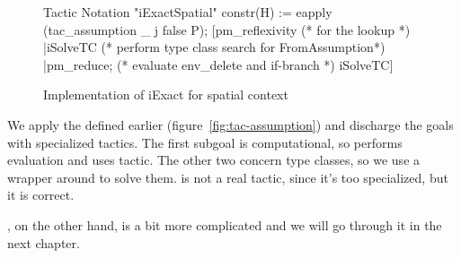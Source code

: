 \begin{figure}[H]
\begin{coq}
Tactic Notation "iExactSpatial" constr(H) :=
  eapply (tac_assumption _ j false P);
    [pm_reflexivity (* for the lookup *)
    |iSolveTC (* perform type class search for FromAssumption*)
    |pm_reduce; (* evaluate env_delete and if-branch *)
     iSolveTC]
\end{coq}
\caption{Implementation of iExact for spatial context}
\label{fig:ltac1-iassumption}
\end{figure}

We apply the  defined earlier (figure~\ref{fig:tac-assumption}) and discharge the goals with specialized tactics.
The first subgoal  is computational, so  performs evaluation and uses  tactic.
The other two concern type classes, so we use a wrapper around  to solve them.
 is not a real tactic, since it's too specialized, but it is correct.

, on the other hand, is a bit more complicated and we will go through it in the next chapter.

